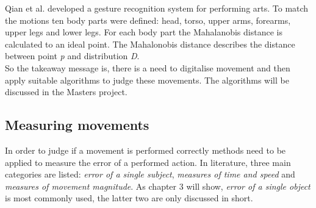 Qian et al. \cite{GangQian2005} developed a gesture recognition system for performing arts. To match the motions ten body parts were defined: head, torso, upper arms, forearms, upper legs and lower legs. For each body part the Mahalanobis distance is calculated to an ideal point. The Mahalonobis distance describes the distance between point \textit{p} and distribution \textit{D}.\\
So the takeaway message is, there is a need to digitalise movement and then apply suitable algorithms to judge these movements. The algorithms will be discussed in the Masters project.

\subsection{Measuring movements}
In order to judge if a movement is performed correctly methods need to be applied to measure the error of a performed action. In literature, three main categories are listed: \textit{error of a single subject}, \textit{measures of time and speed} and \textit{measures of movement magnitude}. As chapter 3 will show, \textit{error of a single object} is most commonly used, the latter two are only discussed in short. 
